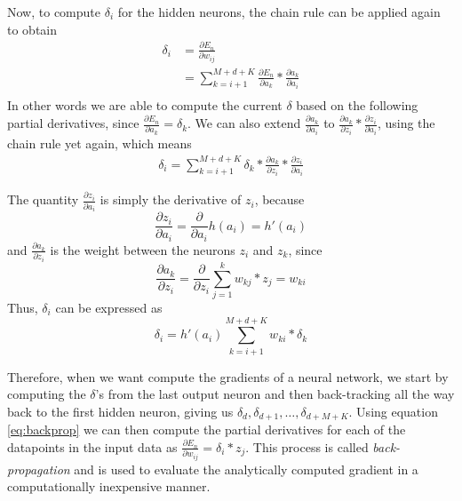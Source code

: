 \documentclass[11pt]{article}
\begin{document}
Now, to compute $\delta_i$ for the hidden neurons, the chain rule can be applied again to obtain
\begin{equation*}
    \begin{aligned}
        \delta_i & = \frac{\partial E_n}{\partial w_{ij}}\\
                 & = \sum\limits_{k=i+1}^{M + d + K} \frac{\partial E_n}{\partial a_k} * \frac{\partial a_k}{\partial a_i}\\
    \end{aligned}
\end{equation*}
In other words we are able to compute the current $\delta$ based on the following partial derivatives,
since $\frac{\partial E_n}{\partial a_k} = \delta_k$.
We can also extend $\frac{\partial a_k}{\partial a_i}$ to $\frac{\partial a_k}{\partial z_i} * \frac{\partial z_i}{\partial a_i}$, using the
chain rule yet again, which means
\begin{equation*}
    \begin{aligned}
        \delta_i = \sum\limits_{k=i+1}^{M + d + K} \delta_k * \frac{\partial a_k}{\partial z_i} * \frac{\partial z_i}{\partial a_i}
    \end{aligned}
\end{equation*}

The quantity $\frac{\partial z_i}{\partial a_i}$ is simply the derivative of $z_i$, because
\begin{equation*}
    \frac{\partial z_i}{\partial a_i} = \frac{\partial}{\partial a_i} h(a_i) = h'(a_i)
\end{equation*}
and $\frac{\partial a_k}{\partial z_i}$ is the weight between the neurons $z_i$ and $z_k$,
since
\begin{equation*}
    \frac{\partial a_k}{\partial z_i} = \frac{\partial}{\partial z_i} \sum\limits_{j = 1}^k w_{kj} * z_j
    = w_{ki}
\end{equation*}
Thus, $\delta_i$ can be expressed as
\begin{equation}
    \delta_i = h'(a_i) \sum\limits_{k=i+1}^{M + d + K} w_{ki} * \delta_k
\end{equation}

Therefore, when we want compute the gradients of a neural network, we start by computing the $\delta$'s from the last output neuron
and then back-tracking all the way back to the first hidden neuron, giving us
$\delta_d, \delta_{d+1}, \dots, \delta_{d + M + K}$.
Using equation \ref{eq:backprop} we can then compute the partial derivatives for each of the datapoints in the input
data as $\frac{\partial E_n}{\partial w_{ij}} = \delta_i * z_j$.
This process is called \textit{back-propagation} and is used to evaluate the analytically computed
gradient in a computationally inexpensive manner.
\end{document}
